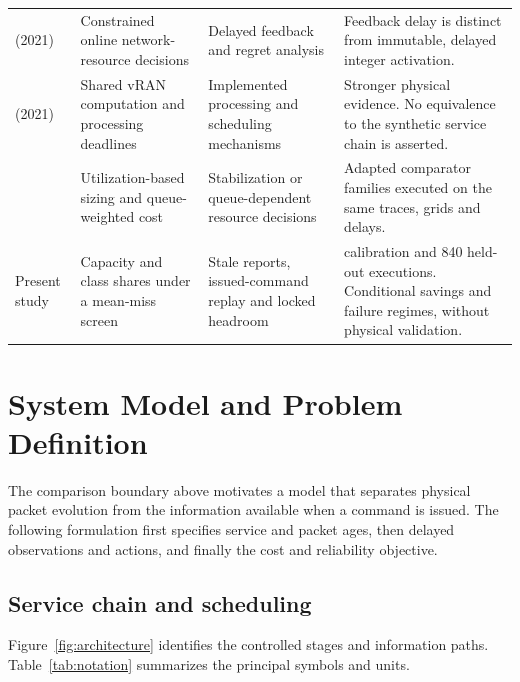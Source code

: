 \documentclass{IEEEoj}
\begin{document}
\begin{table}[!t]
\begin{tabular}{>{\raggedright\arraybackslash}p{23mm}>{\raggedright\arraybackslash}p{43mm}>{\raggedright\arraybackslash}p{47mm}>{\raggedright\arraybackslash}p{47mm}}
\cite{dtc} (2021) & Constrained online network-resource decisions & Delayed feedback and regret analysis & Feedback delay is distinct from immutable, delayed integer activation.\\
\cite{nuberu,concordia} (2021) & Shared vRAN computation and processing deadlines & Implemented processing and scheduling mechanisms & Stronger physical evidence. No equivalence to the synthetic service chain is asserted.\\
\cite{hpa,dppenergy} & Utilization-based sizing and queue-weighted cost & Stabilization or queue-dependent resource decisions & Adapted comparator families executed on the same traces, grids and delays.\\
Present study & Capacity and class shares under a mean-miss screen & Stale reports, issued-command replay and locked headroom & 336 calibration and 840 held-out executions. Conditional savings and failure regimes, without physical validation.\\
\bottomrule\end{tabular}\end{table}


\section{System Model and Problem Definition}
The comparison boundary above motivates a model that separates physical packet
evolution from the information available when a command is issued. The following
formulation first specifies service and packet ages, then delayed observations
and actions, and finally the cost and reliability objective.

\subsection{Service chain and scheduling}
Figure~\ref{fig:architecture} identifies the controlled stages and information paths. Table~\ref{tab:notation} summarizes the principal symbols and units.
\end{document}
